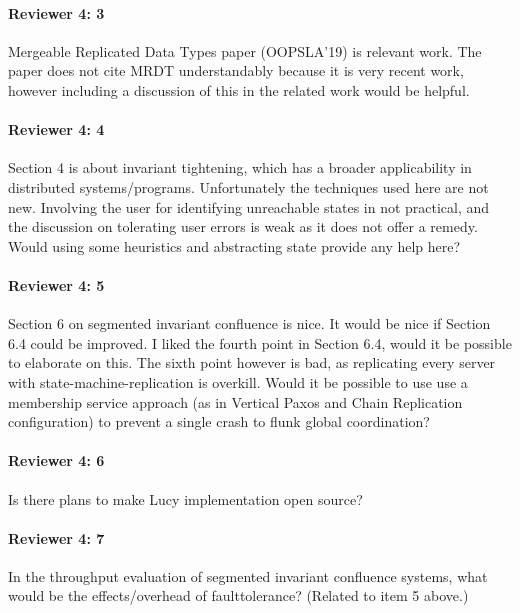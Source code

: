 \documentclass[9pt]{article}
\begin{document}
\begin{multicols*}{2}
\paragraph{Reviewer 4: 3}
\begin{feedback}
  Mergeable Replicated Data Types paper (OOPSLA'19) is relevant work. The paper
  does not cite MRDT understandably because it is very recent work, however
  including a discussion of this in the related work would be helpful.
\end{feedback}

\paragraph{Reviewer 4: 4}
\begin{feedback}
  Section 4 is about invariant tightening, which has a broader applicability in
  distributed systems/programs. Unfortunately the techniques used here are not
  new. Involving the user for identifying unreachable states in not practical,
  and the discussion on tolerating user errors is weak as it does not offer a
  remedy. Would using some heuristics and abstracting state provide any help
  here?
\end{feedback}

\paragraph{Reviewer 4: 5}
\begin{feedback}
  Section 6 on segmented invariant confluence is nice. It would be nice if
  Section 6.4 could be improved. I liked the fourth point in Section 6.4, would
  it be possible to elaborate on this. The sixth point however is bad, as
  replicating every server with state-machine-replication is overkill. Would it
  be possible to use use a membership service approach (as in Vertical Paxos
  and Chain Replication configuration) to prevent a single crash to flunk
  global coordination?
\end{feedback}

\paragraph{Reviewer 4: 6}
\begin{feedback}
  Is there plans to make Lucy implementation open source?
\end{feedback}

\paragraph{Reviewer 4: 7}
\begin{feedback}
  In the throughput evaluation of segmented invariant confluence systems, what
  would be the effects/overhead of faulttolerance? (Related to item 5 above.)
\end{feedback}


\end{multicols*}
\end{document}
